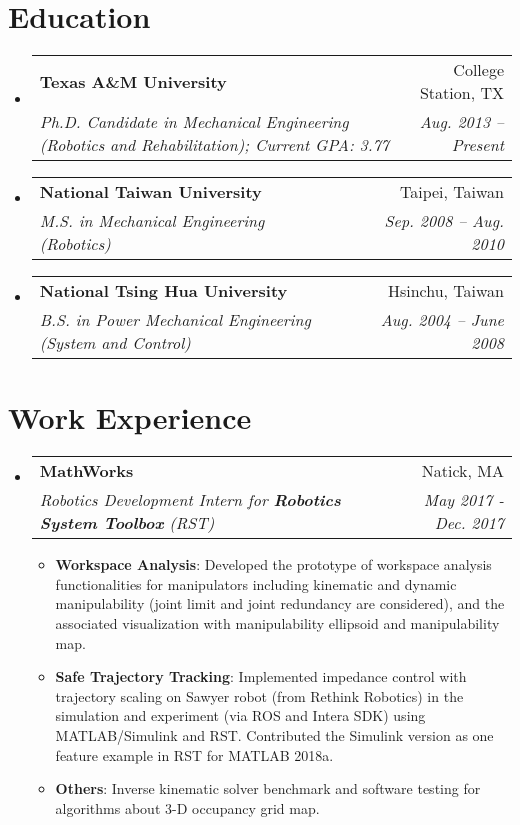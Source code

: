 \documentclass[letterpaper,11pt]{article}
\makeatletter
\newcommand{\resumeItem}[2]{
  \item\small{
    \textbf{#1}{: #2 \vspace{-2pt}}
  }
}
\newcommand{\resumeSubheading}[4]{
  \vspace{-1pt}\item
    \begin{tabular*}{0.97\textwidth}{l@{\extracolsep{\fill}}r}
      \textbf{#1} & #2 \\
      \textit{\small#3} & \textit{\small #4} \\
    \end{tabular*}\vspace{-5pt}
}
\newcommand{\resumeSubHeadingListStart}{\begin{itemize}[leftmargin=*]}
\newcommand{\resumeSubHeadingListEnd}{\end{itemize}}
\newcommand{\resumeItemListStart}{\begin{itemize}}
\newcommand{\resumeItemListEnd}{\end{itemize}\vspace{-5pt}}
\makeatother
\begin{document}
\section{Education}
  \resumeSubHeadingListStart
    \resumeSubheading
      {Texas A\&M University}{College Station, TX}
      {Ph.D. Candidate in {Mechanical Engineering (Robotics and Rehabilitation)};  Current GPA: 3.77}{Aug. 2013 -- Present}
    \resumeSubheading
      {National Taiwan University}{Taipei, Taiwan}
      {M.S. in {Mechanical Engineering (Robotics)}     }{Sep. 2008 -- Aug. 2010}
    \resumeSubheading
      {National Tsing Hua University}{Hsinchu, Taiwan}
      {B.S. in {Power Mechanical Engineering (System and Control)}     }{Aug. 2004 -- June 2008}      
  \resumeSubHeadingListEnd
  

\section{Work Experience}
  \resumeSubHeadingListStart

    \resumeSubheading
      {MathWorks}{Natick, MA}
      {Robotics Development Intern for \textbf{Robotics System Toolbox} (RST)}{May 2017 - Dec. 2017}
      \resumeItemListStart
        \resumeItem{Workspace Analysis}
          {Developed the prototype of workspace analysis functionalities for manipulators including kinematic and dynamic manipulability (joint limit and joint redundancy are considered), and the associated visualization with manipulability ellipsoid and manipulability map.}
        \resumeItem{Safe Trajectory Tracking}
          {Implemented impedance control with trajectory scaling on Sawyer robot (from Rethink Robotics) in the simulation and experiment (via ROS and Intera SDK) using MATLAB/Simulink and RST. Contributed the Simulink version as one feature example in RST for MATLAB 2018a.}
        \resumeItem{Others}
          {Inverse kinematic solver benchmark and software testing for algorithms about 3-D occupancy grid map.}      
      \resumeItemListEnd
  \resumeSubHeadingListEnd


                    
\end{document}
